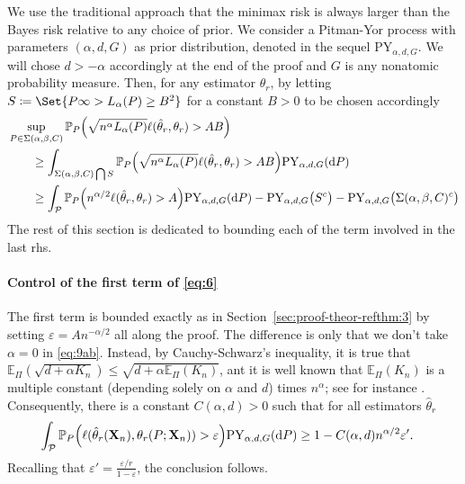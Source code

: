 \documentclass{article}
\newcommand{\1}{\boldsymbol{1}}
\newcommand{\EE}{\mathbb{E}}
\newcommand{\PP}{\mathbb{P}}
\providecommand\given{} %
\theoremstyle{plain}
\begin{document}
We use the traditional approach that the minimax risk is always larger than the Bayes risk relative to any choice of prior. We consider a Pitman-Yor process \cite[Section~14.4]{Gho(17)} with parameters $(\alpha,d,G)$ as prior distribution, denoted in the sequel $\mathrm{PY}_{\alpha,d,G}$. We will chose $d > -\alpha$ accordingly at the end of the proof and $G$ is any nonatomic probability measure. Then, for any estimator $\hat{\theta}_r$, by letting $S \coloneqq \Set{P \given \infty > L_{\alpha}(P) \geq B^2 }$ for a constant $B>0$ to be chosen accordingly
\begin{align}
  \notag
  &\sup_{P\in \Sigma(\alpha,\beta,C)}\PP_P\Big( \sqrt{n^{\alpha}L_{\alpha}(P)} \ell(\hat{\theta}_r,\theta_r) > AB \Big)\\%
  \notag
  &\qquad\geq \int_{\Sigma(\alpha,\beta,C) \bigcap S}\PP_P\Big( \sqrt{n^{\alpha}L_{\alpha}(P)} \ell(\hat{\theta}_r,\theta_r) > AB \Big) \mathrm{PY}_{\alpha,d,G}(\intd P)\\
  &\qquad\geq \int_{\mathcal{P}}\PP_P\Big(n^{\alpha/2}\ell(\hat{\theta}_r,\theta_r) > A \Big) \mathrm{PY}_{\alpha,d,G}(\intd P)%
    - \mathrm{PY}_{\alpha,d,G}\big(S^c\big)%
    - \mathrm{PY}_{\alpha,d,G}\big( \Sigma(\alpha,\beta,C)^c \big)
        \label{eq:6}
\end{align}
The rest of this section is dedicated to bounding each of the term involved in the last rhs.



\paragraph{Control of the first term of \eqref{eq:6}}

The first term is bounded exactly as in Section~\ref{sec:proof-theor-refthm:3} by setting $\varepsilon = An^{-\alpha/2}$ all along the proof. The difference is only that we don't take $\alpha = 0$ in \eqref{eq:9ab}. Instead, 
by Cauchy-Schwarz's inequality, it is true that $\EE_{\Pi}(\sqrt{d + \alpha K_n}) \leq \sqrt{d + \alpha \EE_{\Pi}(K_n)}$, ant it is well known that $\EE_{\Pi}(K_n)$ is a multiple constant (depending solely on $\alpha$ and $d$) times $n^{\alpha}$; see for instance \cite[Section~3.3]{Pit(06)}. Consequently, there is a constant $C(\alpha,d) > 0$ such that for all estimators $\hat{\theta}_r$
\begin{align}
  \label{eq:50:final}
  \int_{\mathcal{P}}\PP_P\Big(\ell(\hat{\theta}_r(\mathbf{X}_n),\theta_r(P;\mathbf{X}_n)) > \varepsilon \Big) \mathrm{PY}_{\alpha,d,G}(\intd P)%
  &\geq  1 - C(\alpha,d) n^{\alpha/2}\varepsilon'.
\end{align}
Recalling that $\varepsilon' = \frac{\varepsilon/r}{1-\varepsilon}$, the conclusion follows.
\end{document}
